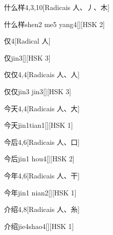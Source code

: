 \begin{entry}{什么样}{4,3,10}[Radicais ⼈、⼃、⽊]
  \begin{phonetics}{什么样}{shen2 me5 yang4}[][HSK 2]
  \end{phonetics}
\end{entry}

\begin{entry}{仅}{4}[Radical ⼈]
  \begin{phonetics}{仅}{jin3}[][HSK 3]
  \end{phonetics}
\end{entry}

\begin{entry}{仅仅}{4,4}[Radicais ⼈、⼈]
  \begin{phonetics}{仅仅}{jin3 jin3}[][HSK 3]
  \end{phonetics}
\end{entry}

\begin{entry}{今天}{4,4}[Radicais ⼈、⼤]
  \begin{phonetics}{今天}{jin1tian1}[][HSK 1]
  \end{phonetics}
\end{entry}

\begin{entry}{今后}{4,6}[Radicais ⼈、⼝]
  \begin{phonetics}{今后}{jin1 hou4}[][HSK 2]
  \end{phonetics}
\end{entry}

\begin{entry}{今年}{4,6}[Radicais ⼈、⼲]
  \begin{phonetics}{今年}{jin1 nian2}[][HSK 1]
  \end{phonetics}
\end{entry}

\begin{entry}{介绍}{4,8}[Radicais ⼈、⽷]
  \begin{phonetics}{介绍}{jie4shao4}[][HSK 1]
  \end{phonetics}
\end{entry}

